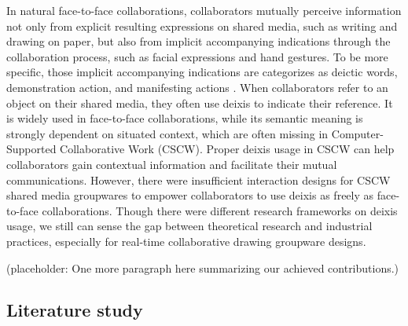 \documentclass[12pt,twoside]{article}
\begin{document}


In natural face-to-face collaborations, collaborators mutually perceive information not only from explicit resulting expressions on shared media, such as writing and drawing on paper, but also from implicit accompanying indications through the collaboration process, such as facial expressions and hand gestures. To be more specific, those implicit accompanying indications are categorizes as deictic words, demonstration action, and manifesting actions \cite{gutwin2002descriptive}. When collaborators refer to an object on their shared media, they often use deixis to indicate their reference. It is widely used in face-to-face collaborations, while its semantic meaning is strongly dependent on situated context, which are often missing in Computer-Supported Collaborative Work (CSCW). Proper deixis usage in CSCW can help collaborators gain contextual information and facilitate their mutual communications. However, there were insufficient interaction designs for CSCW shared media groupwares to empower collaborators to use deixis as freely as face-to-face collaborations. Though there were different research frameworks on deixis usage, we still can sense the gap between theoretical research and industrial practices, especially for real-time collaborative drawing groupware designs.

(placeholder: One more paragraph here summarizing our achieved contributions.)

\subsection{Literature study}
\label{sect:literature}
\end{document}
